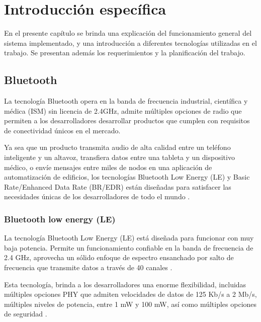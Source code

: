 \chapter{Introducción específica} %

\label{Chapter2}

En el presente capítulo se brinda una explicación del funcionamiento general del sistema implementado, y una introducción a diferentes tecnologías utilizadas en el trabajo. Se presentan además los requerimientos y la planificación del trabajo.

\section{Bluetooth}

La tecnología Bluetooth opera en la banda de frecuencia industrial, científica y médica (ISM) sin licencia de 2.4GHz, admite múltiples opciones de radio que permiten a los desarrolladores desarrollar productos que cumplen con requisitos de conectividad únicos en el mercado. 

Ya sea que un producto transmita audio de alta calidad entre un teléfono inteligente y un altavoz, transfiera datos entre una tableta y un dispositivo médico, o envíe mensajes entre miles de nodos en una aplicación de automatización de edificios, los tecnologías Bluetooth Low Energy (LE) y Basic Rate/Enhanced Data Rate (BR/EDR) están diseñadas para satisfacer las necesidades únicas de los desarrolladores de todo el mundo \cite{5}.


\subsection{Bluetooth low energy (LE)}

La tecnología Bluetooth Low Energy (LE) está diseñada para funcionar con muy baja potencia. Permite un funcionamiento confiable en la banda de frecuencia de 2.4 GHz, aprovecha un sólido enfoque de espectro ensanchado por salto de frecuencia que transmite datos a través de 40 canales \cite{5}.

Esta tecnología, brinda a los desarrolladores una enorme flexibilidad, incluidas múltiples opciones PHY que admiten velocidades de datos de 125 Kb/s a 2 Mb/s, múltiples niveles de potencia, entre 1 mW y 100 mW, así como múltiples opciones de seguridad \cite{5}. 

